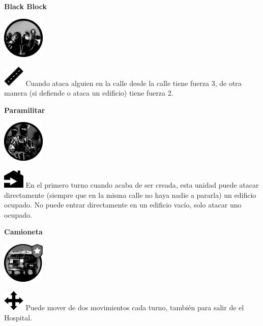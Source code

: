 \documentclass[a4paper,13pt]{scrartcl}
\begin{document}
\begin{minipage}[c]{0.2\textwidth}
	\centering
	\textbf{Black Block}
	\smallskip
	
	\includegraphics[width=2cm]{special_units-blackblock.png}
\end{minipage}\hfill
\begin{minipage}[c]{0.75\textwidth}
	\includegraphics[width=1cm]{street.png} Cuando ataca alguien en la calle desde la calle tiene fuerza 3, de otra manera (si defiende o
	ataca un edificio) tiene fuerza 2.
\end{minipage}
\bigskip

\begin{minipage}[c]{0.2\textwidth}
	\centering
	\textbf{Paramilitar}
	\smallskip
	
	\includegraphics[width=2cm]{special_units-paramilitar.png}
\end{minipage}\hfill
\begin{minipage}[c]{0.75\textwidth}
	\includegraphics[width=1cm]{direct_enter.png} En el primero turno cuando acaba de ser creada, esta unidad puede atacar directamente (siempre que
en la misma calle no haya nadie a pararla) un edificio ocupado. No puede entrar directamente en un edificio vac\'io, solo atacar uno ocupado.
\end{minipage}
\bigskip

\begin{minipage}[c]{0.2\textwidth}
	\centering
	\textbf{Camioneta}
	\smallskip
	
	\includegraphics[width=2cm]{special_units-van.png}
\end{minipage}\hfill
\begin{minipage}[c]{0.75\textwidth}
	\includegraphics[width=1cm]{movement.png} Puede mover de dos movimientos cada turno, tambi\'en para salir de el Hospital.
\end{minipage}
\bigskip
\end{document}
